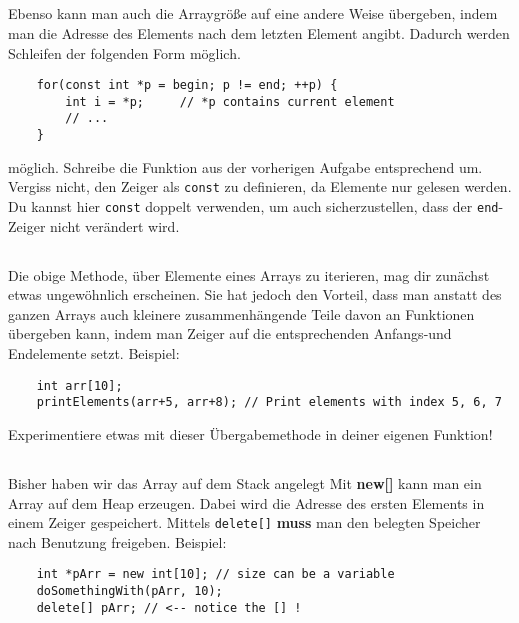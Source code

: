 \subsection{}
Ebenso kann man auch die Arraygröße auf eine andere Weise übergeben, indem man die Adresse des Elements nach dem letzten Element angibt.
Dadurch werden Schleifen der folgenden Form möglich.

\begin{lstlisting}
	for(const int *p = begin; p != end; ++p) {
		int i = *p;		// *p contains current element
		// ...
	}
\end{lstlisting}

möglich.
Schreibe die Funktion aus der vorherigen Aufgabe entsprechend um.
Vergiss nicht, den Zeiger als \texttt{const} zu definieren, da Elemente nur gelesen werden.
Du kannst hier \texttt{const} doppelt verwenden, um auch sicherzustellen, dass der \texttt{end}-Zeiger nicht verändert wird.

\subsection{}
Die obige Methode, über Elemente eines Arrays zu iterieren, mag dir zunächst etwas ungewöhnlich erscheinen.
Sie hat jedoch den Vorteil, dass man anstatt des ganzen Arrays auch kleinere zusammenhängende Teile davon an Funktionen übergeben kann, indem man Zeiger auf die entsprechenden Anfangs-und Endelemente setzt.
Beispiel:

\begin{lstlisting}
	int arr[10];
	printElements(arr+5, arr+8); // Print elements with index 5, 6, 7
\end{lstlisting}

Experimentiere etwas mit dieser Übergabemethode in deiner eigenen Funktion!

\subsection{}
Bisher haben wir das Array auf dem Stack angelegt
Mit \textbf{new[]} kann man ein Array auf dem Heap erzeugen.
Dabei wird die Adresse des ersten Elements in einem Zeiger gespeichert.
Mittels \texttt{delete[]} \textbf{muss} man den belegten Speicher nach Benutzung freigeben.
Beispiel:

\begin{lstlisting}
	int *pArr = new int[10]; // size can be a variable
	doSomethingWith(pArr, 10);
	delete[] pArr; // <-- notice the [] !
\end{lstlisting}

